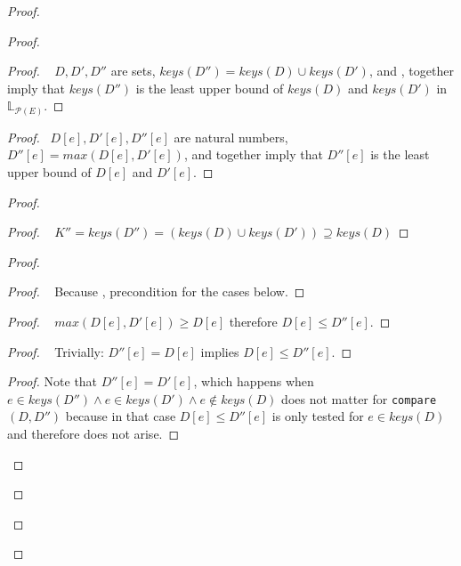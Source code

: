 \documentclass[10pt, oneside]{article}   	%
\begin{document}
\begin{proof}
\begin{proof}
		
		\begin{proof}
			\pf~ $D, D', D''$ are sets, $\textit{keys}(D'') = \textit{keys}(D) \cup \textit{keys}(D')$, and , together imply that $\textit{keys}(D'')$ is the least upper bound of $\textit{keys}(D)$ and $\textit{keys}(D')$ in $\mathds{L}_{\mathcal{P}(E)}$.
		\end{proof}
		
		\begin{proof}
			\pf~$D[e], D'[e], D''[e]$ are natural numbers, $D''[e] = \textit{max}(D[e], D'[e])$, and  together imply that $D''[e]$ is the least upper bound of $D[e]$ and $D'[e]$.
		\end{proof}
		
		\begin{proof}
			\begin{proof}
				\pf~ $K'' = \textit{keys}(D'') = (\textit{keys}(D) \cup \textit{keys}(D')) \supseteq \textit{keys}(D)$
			\end{proof}
		
			\begin{proof}
				\begin{proof}
					\pf~ Because , precondition for the cases below.
				\end{proof}
				
				\begin{proof}
					\pf~  $\textit{max}(D[e], D'[e]) \geq D[e]$ therefore $D[e] \leq D''[e]$.
				\end{proof}
				
				\begin{proof}
					\pf~  Trivially: $D''[e] = D[e]$ implies $D[e] \leq D''[e]$.
				\end{proof}
				
				\qedstep
				\begin{proof}
				 	Note that $D''[e] = D'[e]$, which happens when $e \in \textit{keys}(D'') \wedge e \in \textit{keys}(D') \wedge e \notin \textit{keys}(D)$ does not matter for \texttt{compare}$(D, D'')$ because in that case $D[e] \leq D''[e]$ is only tested for $e \in \textit{keys}(D)$ and therefore does not arise.
				\end{proof}
			\end{proof}
		\end{proof}
		

\end{proof}
\end{proof}
\end{document}
